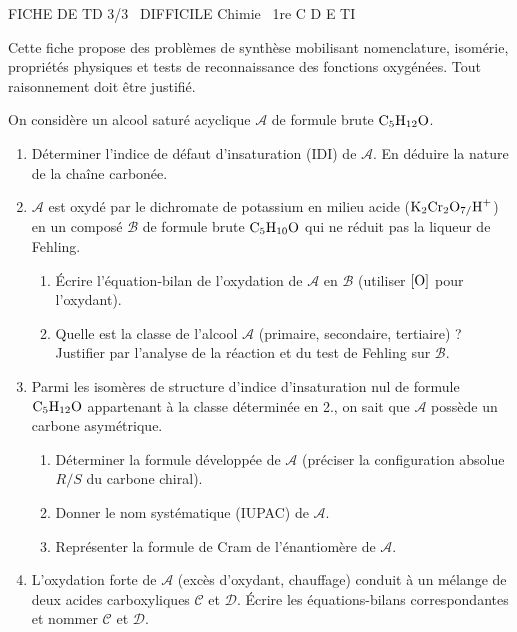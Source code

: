 \documentclass[11pt]{article}
\begin{document}
\begin{tcolorbox}[enhanced,colback=popink,colframe=popink,arc=10pt,boxrule=0pt,left=12pt,right=12pt,top=9pt,bottom=9pt]
{\color{white}\popxbold\small FICHE DE TD 3/3 \textbullet\ DIFFICILE \hfill Chimie \textbullet\ 1re C D E TI\par}
\end{tcolorbox}
\vspace{4pt}
\noindent Cette fiche propose des problèmes de synthèse mobilisant nomenclature, isomérie, propriétés physiques et tests de reconnaissance des fonctions oxygénées. Tout raisonnement doit être justifié.

\begin{exercice}
On considère un alcool saturé acyclique $\mathcal{A}$ de formule brute $\ce{C5H12O}$.
\begin{enumerate}
    \item Déterminer l'indice de défaut d'insaturation (IDI) de $\mathcal{A}$. En déduire la nature de la chaîne carbonée.
    \item $\mathcal{A}$ est oxydé par le dichromate de potassium en milieu acide ($\ce{K2Cr2O7/H+}$) en un composé $\mathcal{B}$ de formule brute $\ce{C5H10O}$ qui ne réduit pas la liqueur de Fehling. 
    \begin{enumerate}
        \item Écrire l'équation-bilan de l'oxydation de $\mathcal{A}$ en $\mathcal{B}$ (utiliser $\ce{[O]}$ pour l'oxydant).
        \item Quelle est la classe de l'alcool $\mathcal{A}$ (primaire, secondaire, tertiaire) ? Justifier par l'analyse de la réaction et du test de Fehling sur $\mathcal{B}$.
    \end{enumerate}
    \item Parmi les isomères de structure d'indice d'insaturation nul de formule $\ce{C5H12O}$ appartenant à la classe déterminée en 2., on sait que $\mathcal{A}$ possède un carbone asymétrique.
    \begin{enumerate}
        \item Déterminer la formule développée de $\mathcal{A}$ (préciser la configuration absolue $R/S$ du carbone chiral).
        \item Donner le nom systématique (IUPAC) de $\mathcal{A}$.
        \item Représenter la formule de Cram de l'énantiomère de $\mathcal{A}$.
    \end{enumerate}
    \item L'oxydation forte de $\mathcal{A}$ (excès d'oxydant, chauffage) conduit à un mélange de deux acides carboxyliques $\mathcal{C}$ et $\mathcal{D}$. Écrire les équations-bilans correspondantes et nommer $\mathcal{C}$ et $\mathcal{D}$.
\end{enumerate}
\end{exercice}
\end{document}
